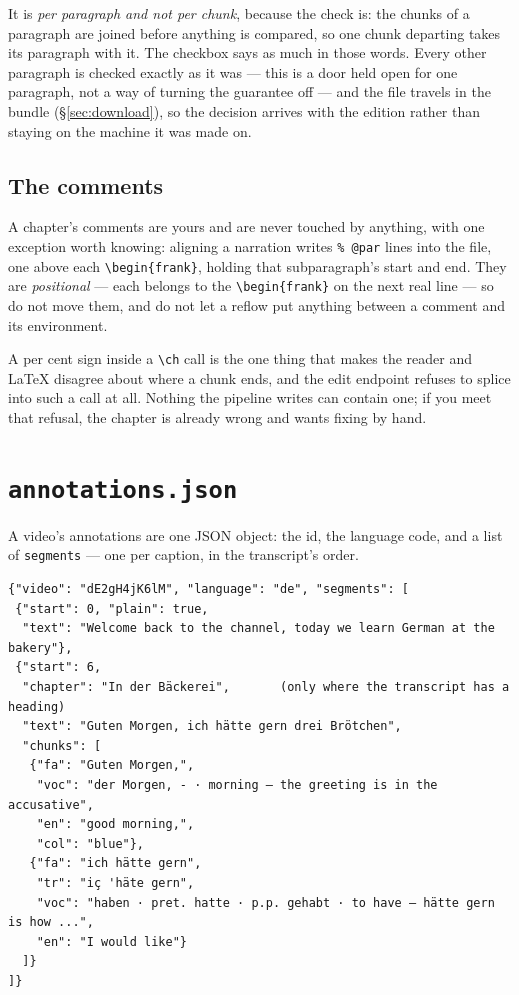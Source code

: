\documentclass[11pt,oneside]{report}
\newcommand{\file}[1]{\texttt{#1}}
\begin{document}
It is \emph{per paragraph and not per chunk}, because the check is: the chunks
of a paragraph are joined before anything is compared, so one chunk departing
takes its paragraph with it. The checkbox says as much in those words. Every
other paragraph is checked exactly as it was --- this is a door held open for
one paragraph, not a way of turning the guarantee off --- and the file travels
in the bundle (\S\ref{sec:download}), so the decision arrives with the edition
rather than staying on the machine it was made on.

\subsection*{The comments}

A chapter's comments are yours and are never touched by anything, with one
exception worth knowing: aligning a narration writes \texttt{\% @par} lines
into the file, one above each \verb|\begin{frank}|, holding that
subparagraph's start and end. They are \emph{positional} --- each belongs to
the \verb|\begin{frank}| on the next real line --- so do not move them, and do
not let a reflow put anything between a comment and its environment.

\begin{warnbox}
A per cent sign inside a \verb|\ch| call is the one thing that makes the
reader and LaTeX disagree about where a chunk ends, and the edit endpoint
refuses to splice into such a call at all. Nothing the pipeline writes can
contain one; if you meet that refusal, the chapter is already wrong and wants
fixing by hand.
\end{warnbox}

\section{\file{annotations.json}}
\label{sec:annjson}

A video's annotations are one JSON object: the id, the language code, and a
list of \texttt{segments} --- one per caption, in the transcript's order.

\begin{lstlisting}
{"video": "dE2gH4jK6lM", "language": "de", "segments": [
 {"start": 0, "plain": true,
  "text": "Welcome back to the channel, today we learn German at the bakery"},
 {"start": 6,
  "chapter": "In der Bäckerei",       (only where the transcript has a heading)
  "text": "Guten Morgen, ich hätte gern drei Brötchen",
  "chunks": [
   {"fa": "Guten Morgen,",
    "voc": "der Morgen, - · morning — the greeting is in the accusative",
    "en": "good morning,",
    "col": "blue"},
   {"fa": "ich hätte gern",
    "tr": "iç 'häte gern",
    "voc": "haben · pret. hatte · p.p. gehabt · to have — hätte gern is how ...",
    "en": "I would like"}
  ]}
]}
\end{lstlisting}
\end{document}
